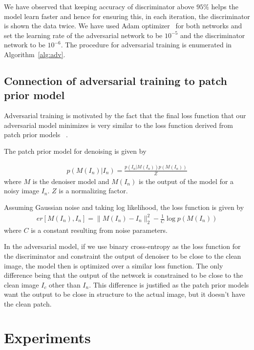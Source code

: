 \documentclass[10pt,twocolumn,letterpaper]{proc}
\begin{document}
We have observed that keeping accuracy of discriminator above $95\%$ helps the model learn faster and hence for ensuring this, in each iteration, the discriminator is shown the data twice. We have used Adam optimizer~\cite{adamoptimizer} for both networks and set the learning rate of the adversarial network to be $10^{-5}$ and the discriminator network to be $10^{-6}$. The procedure for adversarial training is enumerated in Algorithm~\ref{alg:adv}.





\subsection*{Connection of adversarial training to patch prior model}

Adversarial training is motivated by the fact that the final loss function that our adversarial model minimizes is very similar to the loss function derived from patch prior models ~\cite{roth2005fields,schmidt2014shrinkage,zoran2011learning}.



The patch prior model for denoising is given by

\begin{align}
    p(M(I_n)|I_n) = \frac{p(I_n|M(I_n))p(M(I_n))}{Z}
\end{align}
where $M$ is the denoiser model and $M(I_n)$ is the output of the model for a noisy image $I_n$. $Z$ is a normalizing factor.

Assuming Gaussian noise and taking log likelihood, the loss function is given by
\begin{align}
    er[M(I_n),I_n] = \|M(I_n) - I_n\|_2^2 - \frac{1}{C}\log p(M(I_n))
\end{align}
where $C$ is a constant resulting from noise parameters.

In the adversarial model, if we use binary cross-entropy as the loss function for the discriminator and constraint the output of denoiser to be close to the clean image, the model then is optimized over a similar loss function. The only difference being that the output of the network is constrained to be close to the clean image $I_c$  other than $I_n$. This difference is justified as the patch prior models want the output to be close in structure to the actual image, but it doesn't have the clean patch.


    
\section{Experiments}\label{sec:exp}
%     
\end{document}
